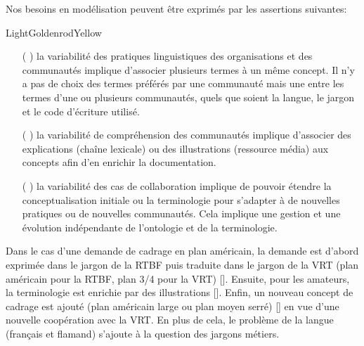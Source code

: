 Nos besoins en modélisation peuvent être exprimés par les assertions suivantes:
\begin{problemes}{LightGoldenrodYellow}
\begin{enumerate}
	\item[(\e{$\delta_1$}]) la variabilité des pratiques linguistiques des organisations et des communautés implique d'associer plusieurs termes à un même concept. 
	Il n'y a pas de choix des termes préférés par une communauté mais une  entre les termes d'une ou plusieurs communautés, quels que soient la langue, le jargon et le code d'écriture utilisé.
	
	\item[(\e{$\delta_2$}]) la variabilité de compréhension des communautés implique d'associer des explications (chaîne lexicale) ou des illustrations (ressource média) aux concepts afin d'en enrichir la documentation. 
	
	\item[(\e{$\delta_3$}]) la variabilité des cas de collaboration implique de pouvoir étendre la conceptualisation initiale ou la terminologie pour s'adapter à de nouvelles pratiques ou de nouvelles communautés. 
	Cela implique une gestion et une évolution indépendante de l'ontologie et de la terminologie. 
\end{enumerate}
\end{problemes}

Dans le cas d'une demande de cadrage en plan américain, la demande est d'abord exprimée dans le jargon de la RTBF puis traduite dans le jargon de la VRT (plan américain pour la RTBF, plan 3/4 pour la VRT) []. 
Ensuite, pour les amateurs, la terminologie est enrichie par des illustrations []. Enfin, un nouveau concept de cadrage est ajouté (plan américain large ou plan moyen serré) [] en vue d'une nouvelle coopération avec la VRT. En plus de cela, le problème de la langue (français et flamand) s'ajoute à la question des jargons métiers. 
